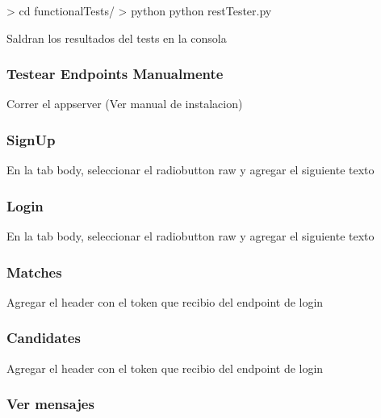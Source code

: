 \documentclass[letterpaper,10pt,english]{sphinxmanual}
\begin{document}
\textgreater{} cd functionalTests/
\textgreater{} python python restTester.py

Saldran los resultados del tests en la consola


\subsubsection{Testear Endpoints Manualmente}
\label{manuals:testear-endpoints-manualmente}
Correr el appserver (Ver manual de instalacion)


\subsubsection{SignUp}
\label{manuals:id3}

En la tab body, seleccionar el radiobutton raw y agregar el siguiente texto



\subsubsection{Login}
\label{manuals:id4}

En la tab body, seleccionar el radiobutton raw y agregar el siguiente texto



\subsubsection{Matches}
\label{manuals:matches}

Agregar el header con el token que recibio del endpoint de login



\subsubsection{Candidates}
\label{manuals:candidates}

Agregar el header con el token que recibio del endpoint de login



\subsubsection{Ver mensajes}
\label{manuals:ver-mensajes}
\end{document}
